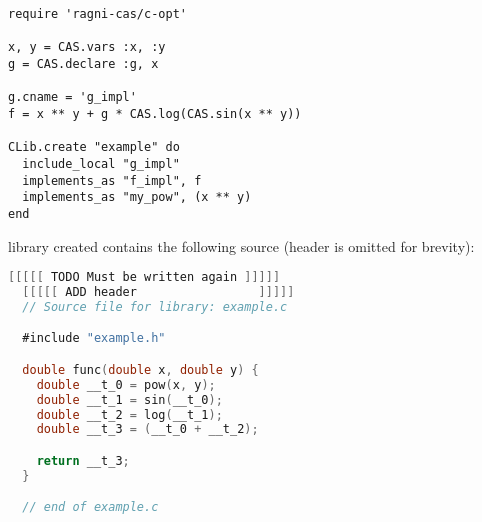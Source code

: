 \begin{lstlisting}[caption={Calling optimized-C exporter for library generation},label={code:example-exporting-C-1}]
require 'ragni-cas/c-opt'

x, y = CAS.vars :x, :y
g = CAS.declare :g, x

g.cname = 'g_impl'
f = x ** y + g * CAS.log(CAS.sin(x ** y))

CLib.create "example" do
  include_local "g_impl"
  implements_as "f_impl", f
  implements_as "my_pow", (x ** y)
end
\end{lstlisting}
library created contains the following source (header is omitted for brevity):
\begin{lstlisting}[caption={Calling optimized-C exporter},label={code:example-exporting-C-2},language=C]
  [[[[[ TODO Must be written again ]]]]]
  [[[[[ ADD header                 ]]]]]
  // Source file for library: example.c

  #include "example.h"

  double func(double x, double y) {
    double __t_0 = pow(x, y);
    double __t_1 = sin(__t_0);
    double __t_2 = log(__t_1);
    double __t_3 = (__t_0 + __t_2);

    return __t_3;
  }

  // end of example.c
\end{lstlisting}
